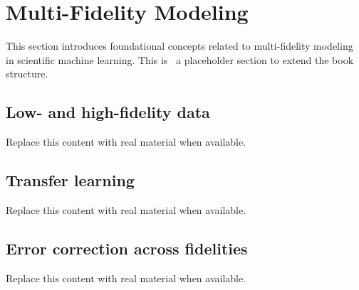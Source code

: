 \section{Multi-Fidelity Modeling}
This section introduces foundational concepts related to multi-fidelity modeling in scientific machine learning. This is~\cite{abdulmaksoudTransformerBasedSensorFusion2025} a placeholder section to extend the book structure.

\subsection{Low- and high-fidelity data}
Replace this content with real material when available.

\subsection{Transfer learning}
Replace this content with real material when available.

\subsection{Error correction across fidelities}
Replace this content with real material when available.
